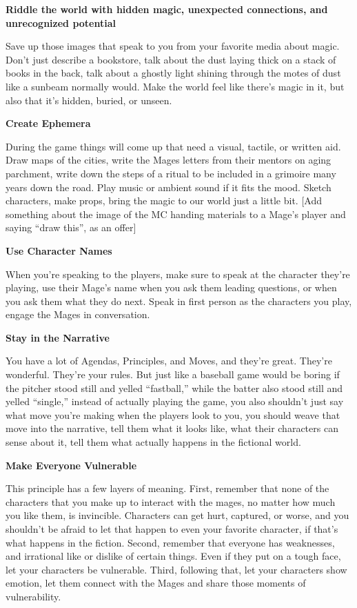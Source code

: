 \documentclass[
  oneside,
  statementpaper,
  9pt]{memoir}
\begin{document}
\textbf{Riddle the world with hidden magic, unexpected connections, and
unrecognized potential}

Save up those images that speak to you from your favorite media about
magic. Don't just describe a bookstore, talk about the dust laying thick
on a stack of books in the back, talk about a ghostly light shining
through the motes of dust like a sunbeam normally would. Make the world
feel like there's magic in it, but also that it's hidden, buried, or
unseen.

\textbf{Create Ephemera}

During the game things will come up that need a visual, tactile, or
written aid. Draw maps of the cities, write the Mages letters from their
mentors on aging parchment, write down the steps of a ritual to be
included in a grimoire many years down the road. Play music or ambient
sound if it fits the mood. Sketch characters, make props, bring the
magic to our world just a little bit. {[}Add something about the image
of the MC handing materials to a Mage's player and saying ``draw this'',
as an offer{]}

\textbf{Use Character Names}

When you're speaking to the players, make sure to speak at the character
they're playing, use their Mage's name when you ask them leading
questions, or when you ask them what they do next. Speak in first person
as the characters you play, engage the Mages in conversation.

\textbf{Stay in the Narrative}

You have a lot of Agendas, Principles, and Moves, and they're great.
They're wonderful. They're your rules. But just like a baseball game
would be boring if the pitcher stood still and yelled ``fastball,''
while the batter also stood still and yelled ``single,'' instead of
actually playing the game, you also shouldn't just say what move you're
making when the players look to you, you should weave that move into the
narrative, tell them what it looks like, what their characters can sense
about it, tell them what actually happens in the fictional world.

\textbf{Make Everyone Vulnerable}

This principle has a few layers of meaning. First, remember that none of
the characters that you make up to interact with the mages, no matter
how much you like them, is invincible. Characters can get hurt,
captured, or worse, and you shouldn't be afraid to let that happen to
even your favorite character, if that's what happens in the fiction.
Second, remember that everyone has weaknesses, and irrational like or
dislike of certain things. Even if they put on a tough face, let your
characters be vulnerable. Third, following that, let your characters
show emotion, let them connect with the Mages and share those moments of
vulnerability.
\end{document}

